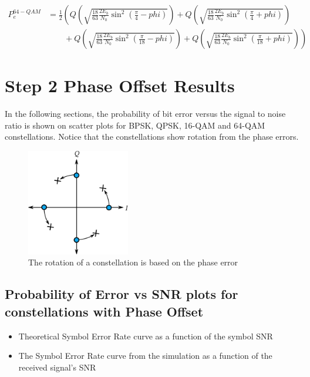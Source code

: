 \documentclass[]{article}
\begin{document}
\begin{align}
P_{e}^{64-QAM} &= \frac{1}{2}\left(Q\left(\sqrt{\frac{18}{63}\frac{2E_b}{N_0}\sin^2\left(\frac{\pi}{4}-phi\right)}\right) + Q\left(\sqrt{\frac{18}{63}\frac{2E_b}{N_0}\sin^2\left(\frac{\pi}{4}+phi\right)}\right) \right. \nonumber \\
& \qquad \left. {} + Q\left(\sqrt{\frac{18}{63}\frac{2E_b}{N_0}\sin^2\left(\frac{\pi}{18}-phi\right)}\right) + Q\left(\sqrt{\frac{18}{63}\frac{2E_b}{N_0}\sin^2\left(\frac{\pi}{18}+phi\right)}\right) \right) 
\end{align}

\section{Step 2 Phase Offset Results}
\label{sec:results_po}
In the following sections, the probability of bit error versus the signal to noise ratio is shown on scatter plots for BPSK, QPSK, 16-QAM and 64-QAM constellations.  Notice that the constellations show rotation from the phase errors.  

\begin{figure}[H]
\centering
\hspace*{-2cm}\includegraphics[width=0.4\textwidth]{qpskError.png}
\caption{The rotation of a constellation is based on the phase error}
\end{figure}

\subsection{Probability of Error vs SNR plots for constellations with Phase Offset}
\begin{itemize}
\item Theoretical Symbol Error Rate curve as a function of the symbol SNR
\item The Symbol Error Rate curve from the simulation as a function of the received signal's SNR
\end{itemize}
\end{document}

